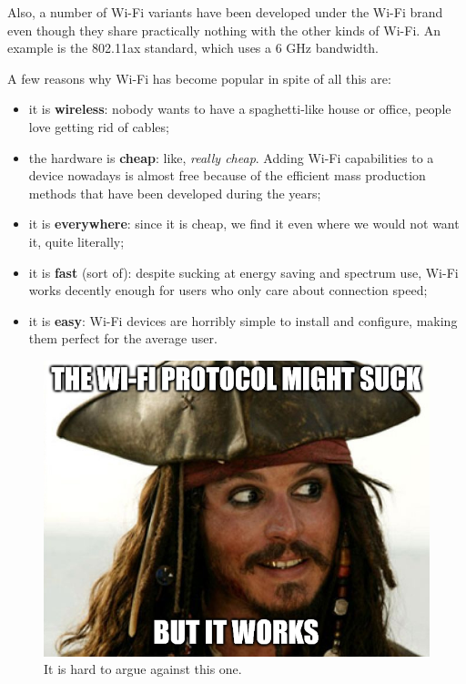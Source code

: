 Also, a number of Wi-Fi variants have been developed under the Wi-Fi brand even though they share practically nothing with the other kinds of Wi-Fi. An example is the 802.11ax standard, which uses a 6 GHz bandwidth.

A few reasons why Wi-Fi has become popular in spite of all this are:

\begin{itemize}
    \item it is \textbf{wireless}: nobody wants to have a spaghetti-like house or office, people love getting rid of cables;
    \item the hardware is \textbf{cheap}: like, \textit{really cheap}. Adding Wi-Fi capabilities to a device nowadays is almost free because of the efficient mass production methods that have been developed during the years;
    \item it is \textbf{everywhere}: since it is cheap, we find it even where we would not want it, quite literally;
    \item it is \textbf{fast} (sort of): despite sucking at energy saving and spectrum use, Wi-Fi works decently enough for users who only care about connection speed;
    \item it is \textbf{easy}: Wi-Fi devices are horribly simple to install and configure, making them perfect for the average user.
\end{itemize}

\begin{figure}[h]
    \centering
    \includegraphics[scale=0.5]{img/wifi_sucks_meme.png}
    \decoRule
    \caption{It is hard to argue against this one.}
    \label{fig:wifi_sucks_meme}
\end{figure}

